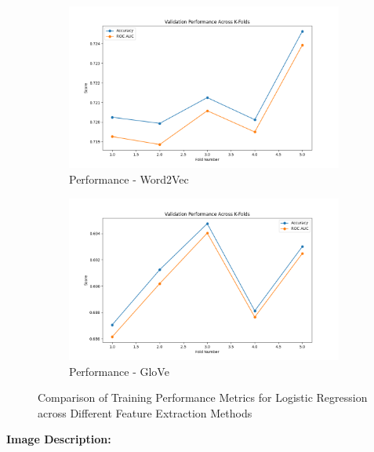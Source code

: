 \begin{figure}[H]
    \begin{subfigure}[b]{0.48\textwidth}
        \includegraphics[width=\textwidth]{img/report_info/img/1.1.LogisticRegression/best_logistic_regression_word2vec.png}
        \caption{Performance - Word2Vec}
        \label{fig:lr-word2vec}
    \end{subfigure}
    \begin{subfigure}[b]{0.48\textwidth}
        \includegraphics[width=\textwidth]{img/report_info/img/1.1.LogisticRegression/best_logistic_regression_glove.png}
        \caption{Performance - GloVe}
        \label{fig:lr-glove}
    \end{subfigure}
    
    \caption{Comparison of Training Performance Metrics for Logistic Regression across Different Feature Extraction Methods}
    \label{fig:lr-performance-group}
\end{figure}

\textbf{Image Description:}

